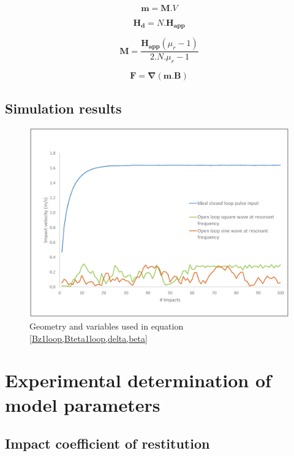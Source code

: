 \documentclass[letterpaper, 10 pt, conference]{ieeeconf}  %
\begin{document}
\begin{equation}
\mathbf{m}=\mathbf{M}.V
\label{mag}
\end{equation}

\begin{equation}
\mathbf{H_d}=N.\mathbf{H_{app}}
\label{hd}
\end{equation}

\begin{equation}
\mathbf{M}=\frac{\mathbf{H_{app}}\left ( \mu_r-1  \right )}{2.N.\mu_r-1}
\label{mag2}
\end{equation}

\begin{equation}
\mathbf{F}=\mathbf{\nabla}(\mathbf{m}.\mathbf{B})
\label{force}
\end{equation}

\subsection{Simulation results}

\begin{figure}
  \includegraphics[width=\linewidth]{close_vs_open_loop.eps}
  \caption{Geometry and variables used in equation \cref{Bz1loop,Bteta1loop,delta,beta}}
  \label{close_vs_open_loop}
\end{figure}


\section{Experimental determination of model parameters}

\subsection{Impact coefficient of restitution}
\end{document}
